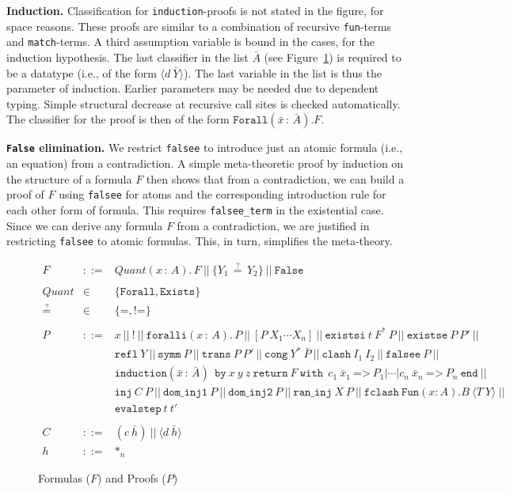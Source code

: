 \documentclass{fundam}
\newcommand{\Eq}[0]{\texttt{=}}
\newcommand{\Neq}[0]{\texttt{!=}}
\newcommand{\Qeq}[0]{\stackrel{?}{=}}
\newcommand{\bang}[0]{\texttt{!}}
\newcommand{\quant}[0]{\textit{Quant}}
\begin{document}
\textbf{Induction.} Classification for \texttt{induction}-proofs is
not stated in the figure, for space reasons.  These proofs are similar
to a combination of recursive \texttt{fun}-terms and
\texttt{match}-terms.  A third assumption variable is bound in the
cases, for the induction hypothesis.  The last classifier in the list
$\bar{A}$ (see Figure~\ref{fig:formulas-proofs}) is required to be a
datatype (i.e., of the form $\langle d\ \bar{Y}\rangle$).  The last
variable in the list is thus the parameter of induction.  Earlier
parameters may be needed due to dependent typing.  Simple structural
decrease at recursive call sites is checked automatically.  The
classifier for the proof is then of the form
$\texttt{Forall}(\bar{x}\,:\,\bar{A}). F$.

\textbf{\texttt{False} elimination.} We restrict \texttt{falsee} to
introduce just an atomic formula (i.e., an equation) from a
contradiction.  A simple meta-theoretic proof by induction on the
structure of a formula $F$ then shows that from a contradiction, we
can build a proof of $F$ using \texttt{falsee} for atoms and the
corresponding introduction rule for each other form of formula.  This
requires \texttt{falsee\_term} in the existential case.  Since we can
derive any formula $F$ from a contradiction, we are justified in
restricting \texttt{falsee} to atomic formulas.  This, in turn,
simplifies the meta-theory.

\begin{figure}
\begin{eqnarray*}
F & ::= & \quant(x\,:\,A). \, F\ ||\  \{ Y_1\, \Qeq\, Y_2 \}\ ||\ \texttt{False}\\ \\
\quant & \in & \{ \texttt{Forall}, \texttt{Exists} \} \\ 
\Qeq & \in & \{ \Eq, \Neq \} 
\\ \\
P & ::= & x\ ||\ \bang\ ||\ 
        \texttt{foralli}
         (x\,:\,A) . \, P\ ||\ [P\ X_1 \cdots X_n]\ ||\ 
  \texttt{existsi}\ t\ F^*\ P\ ||\ \texttt{existse}\ P\ P'\ ||\\
\ & \ &  \texttt{refl}\ Y\ ||\
 \texttt{symm}\ P\ ||\ \texttt{trans}\ P\ P'\ ||\ 
 \texttt{cong}\ Y^*\ \bar{P}\ || \ \texttt{clash}\ I_1\ I_2\ ||\ \texttt{falsee}\ P\ ||\ \\
\ & \ & \texttt{induction}(\bar{x}\,:\,\bar{A})\ \ 
\texttt{by}\ x\ y\ z\ 
\texttt{return}\ F\ \texttt{with}\ \ 
c_1\ \bar{x}_1\ \texttt{=>}\ P_1 | 
 \cdots | c_n\ \bar{x}_n\ \texttt{=>}\ P_n\ \texttt{end}\ || \\
\ &\ & \texttt{inj}\ C\ P\ ||\ \texttt{dom\_inj1}\ P\ ||\ \texttt{dom\_inj2}\ P\ ||\ \texttt{ran\_inj}\ X\ P\ 
||\ \texttt{fclash}\ \texttt{Fun}(x:A).B\ \langle T\ Y \rangle\  || \\
\ &\ & \texttt{evalstep}\ t\ t' \\ \\
C & ::= & (c\ \bar{h})\ ||\ \langle d\ \bar{h} \rangle \\ 
h & ::= & *_n
\end{eqnarray*}
\caption{\label{fig:formulas-proofs} Formulas ($F$) and Proofs ($P$)}
\end{figure}
\end{document}
